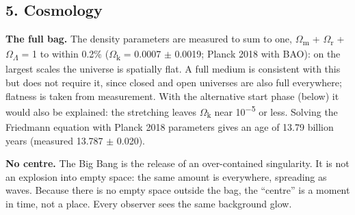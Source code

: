 \documentclass[
  11pt,
]{article}
\begin{document}
\hypertarget{cosmology}{%
\subsection{5. Cosmology}\label{cosmology}}

\textbf{The full bag.} The density parameters are measured to sum to one, \ensuremath{\Omega}\textsubscript{m} + \ensuremath{\Omega}\textsubscript{r} + \ensuremath{\Omega}\textsubscript{\ensuremath{\Lambda}} = 1 to within 0.2\% (\ensuremath{\Omega}\textsubscript{k} = 0.0007 \ensuremath{\pm} 0.0019; Planck 2018 with BAO): on the largest scales the universe is spatially flat. A full medium is consistent with this but does not require it, since closed and open universes are also full everywhere; flatness is taken from measurement. With the alternative start phase (below) it would also be explained: the stretching leaves \textbar \ensuremath{\Omega}\textsubscript{k}\textbar{} near 10\textsuperscript{\ensuremath{-}5} or less. Solving the Friedmann equation with Planck 2018 parameters gives an age of 13.79 billion years (measured 13.787 \ensuremath{\pm} 0.020).

\textbf{No centre.} The Big Bang is the release of an over-contained singularity. It is not an explosion into empty space: the same amount is everywhere, spreading as waves. Because there is no empty space outside the bag, the ``centre'' is a moment in time, not a place. Every observer sees the same background glow.
\end{document}
